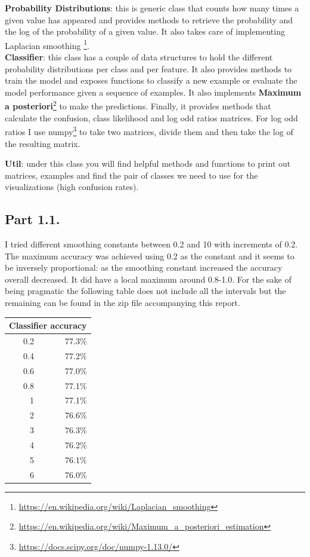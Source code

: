\documentclass[11pt]{article}
\begin{document}
\textbf{Probability Distributions}: this is generic class that counts how many times a given value has appeared and provides methods to retrieve the probability and the log of the probability of a given value. It also takes care of implementing Laplacian smoothing \footnote{\url{https://en.wikipedia.org/wiki/Laplacian_smoothing}}.\\

\textbf{Classifier}: this class has a couple of data structures to hold the different probability distributions per class and per feature. It also provides methods to train the model and exposes functions to classify a new example or evaluate the model performance given a sequence of examples. It also implements \textbf{Maximum a posteriori}\footnote{\url{https://en.wikipedia.org/wiki/Maximum_a_posteriori_estimation}} to make the predictions. Finally, it provides methods that calculate the confusion, class likelihood and log odd ratios matrices. For log odd ratios I use numpy\footnote{\url{https://docs.scipy.org/doc/numpy-1.13.0/}} to take two matrices, divide them and then take the log of the resulting matrix.

\textbf{Util}: under this class you will find helpful methods and functions to print out matrices, examples and find the pair of classes we need to use for the visualizations (high confusion rates).

\subsection*{Part 1.1.}
I tried different smoothing constants between 0.2 and 10 with increments of 0.2. The maximum accuracy was achieved using 0.2 as the constant and it seems to be inversely proportional: as the smoothing constant increased the accuracy overall decreased. It did have a local maximum around 0.8-1.0. For the sake of being pragmatic the following table does not include all the intervals but the remaining can be found in the zip file accompanying this report.

\begin{center}
\begin{tabular}{ |r|r| }
  \hline
  \multicolumn{2}{|c|}{Classifier accuracy} \\
  \hline
  0.2 & 77.3\% \\
  0.4 & 77.2\% \\
  0.6 & 77.0\% \\
  0.8 & 77.1\% \\
  1 & 77.1\% \\
  2 & 76.6\% \\
  3 & 76.3\% \\
  4 & 76.2\% \\
  5 & 76.1\% \\
  6 & 76.0\% \\
  \hline
\end{tabular}
\end{center}
\end{document}

